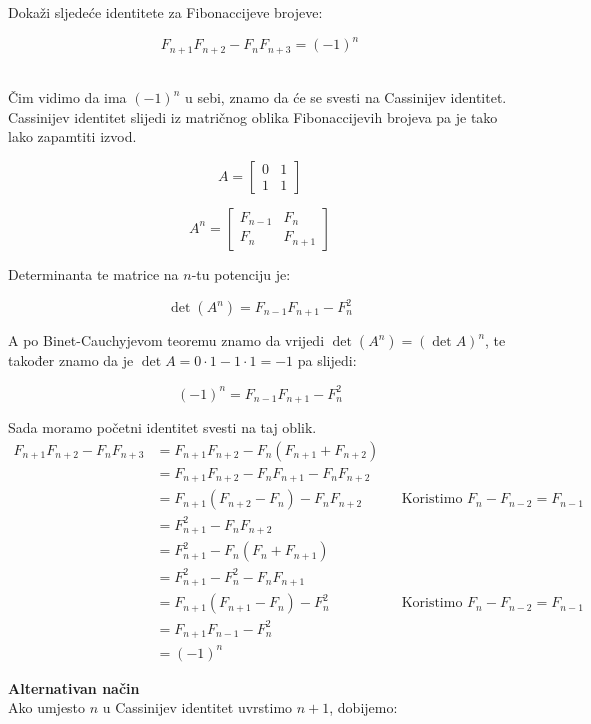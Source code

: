 \documentclass[exam.tex]{subfiles}
\begin{document}
	\begin{subtask}
		Dokaži sljedeće identitete za Fibonaccijeve brojeve:
	
		\[ F_{n + 1} F_{n + 2} - F_n F_{n + 3} = (-1)^n \]\\
	\end{subtask}
	
	Čim vidimo da ima \( (-1)^n \) u sebi, znamo da će se svesti na Cassinijev identitet. Cassinijev identitet slijedi iz matričnog oblika Fibonaccijevih brojeva pa je tako lako zapamtiti izvod.
	
	$$ A =  \begin{bmatrix}
		0 & 1 \\
		1 & 1 
	\end{bmatrix}  $$
	
	$$ A^n =  \begin{bmatrix}
		F_{n - 1} & F_n \\
		F_n & F_{n + 1}
	\end{bmatrix} $$
	
	Determinanta te matrice na \(n\)-tu potenciju je:
	
	\[ \det (A^n) = F_{n - 1} F_{n + 1} - F^2_n \]
	
	A po Binet-Cauchyjevom teoremu znamo da vrijedi \( \det (A^n) = (\det A)^n \), te također znamo da je \( \det A = 0 \cdot 1 - 1 \cdot 1 = -1 \) pa slijedi:
	
	\[ (-1)^n = F_{n - 1} F_{n + 1} - F^2_n \]
	
	Sada moramo početni identitet svesti na taj oblik. 
	\begin{align*}
		F_{n + 1} F_{n + 2} - F_n F_{n + 3} &= F_{n + 1} F_{n + 2} - F_n (F_{n + 1} + F_{n + 2}) \\
		&= F_{n + 1} F_{n + 2} - F_n F_{n + 1} - F_n F_{n + 2} \\
		&= F_{n + 1} (F_{n + 2} - F_n) - F_n F_{n + 2} && \text{Koristimo } F_n - F_{n - 2} = F_{n - 1}\\
		&= F^2_{n + 1} - F_n F_{n + 2} \\
		&= F^2_{n + 1} - F_n (F_n + F_{n + 1}) \\
		&= F^2_{n + 1} - F^2_n - F_n F_{n + 1} \\
		&= F_{n + 1} (F_{n + 1} - F_n) - F_n^2 && \text{Koristimo } F_n - F_{n - 2} = F_{n - 1}\\
		&= F_{n + 1} F_{n - 1} - F_n^2 \\
		&= (-1)^n
	\end{align*}
	
	\textbf{Alternativan način} \\
	Ako umjesto \( n \) u Cassinijev identitet uvrstimo \( n + 1 \), dobijemo:
	
\end{document}
